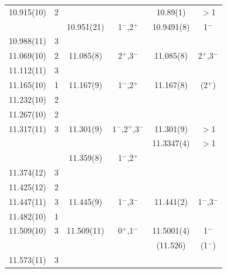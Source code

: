 \begin{center}
\begin{longtable}{cc cc cc}
      10.915(10)  & 2        &                  &                     & 10.89(1)    &  $>$1           \\
                  &          &  10.951(21)      &  1$^-$,2$^+$        & 10.9491(8)  &  1$^-$          \\
   10.988(11)     & 3        &                  &                     &             &                 \\
    11.069(10)    & 2        &  11.085(8)       &  2$^+$,3$^-$        & 11.085(8)   &  2$^+$,3$^- $   \\
     11.112(11)   & 3        &                  &                     &             &                 \\
    11.165(10)    & 1        &  11.167(9)       &  1$^-$,2$^+$        & 11.167(8)   &  (2$^+$)        \\
    11.232(10)    & 2        &                  &                     &             &                 \\
    11.267(10)    & 2        &                  &                     &             &                 \\
    11.317(11)    & 3        &  11.301(9)       &  1$^-$,2$^+$,3$^-$  & 11.301(9)   &  $>$1           \\
                  &          &                  &                     & 11.3347(4)  &  $>$1           \\
                  &          &  11.359(8)       &  1$^-$,2$^+$        &             &                 \\
    11.374(12)    & 3        &                  &                     &             &                 \\
    11.425(12)    & 2        &                  &                     &             &                 \\
    11.447(11)    & 3        &  11.445(9)       &  1$^-$,3$^-$        & 11.441(2)   &  1$^-$,3$^-$    \\
    11.482(10)    & 1        &                  &                     &             &                 \\
    11.509(10)    & 3        &  11.509(11)      &  0$^+$,1$^-$        & 11.5001(4)  &  1$^-$          \\
                  &          &                  &                     & (11.526)    &  (1$^-$)        \\
     11.573(11)   & 3        &                  &                     &             &                 \\

\end{longtable}
\end{center}
